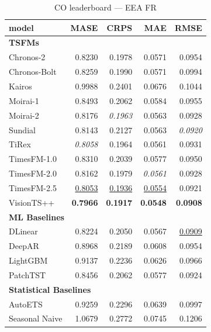 \begin{table}[H]
\caption{CO leaderboard --- EEA FR}
\centering
\begin{small}
\begin{tabular}{lrrrr}
\toprule
model & MASE & CRPS & MAE & RMSE \\
\midrule
\multicolumn{5}{l}{\textbf{TSFMs}} \\
Chronos-2 & 0.8230 & 0.1978 & 0.0571 & 0.0954 \\
Chronos-Bolt & 0.8259 & 0.1990 & 0.0571 & 0.0994 \\
Kairos & 0.9988 & 0.2401 & 0.0676 & 0.1044 \\
Moirai-1 & 0.8493 & 0.2062 & 0.0584 & 0.0955 \\
Moirai-2 & 0.8176 & \textit{0.1963} & 0.0563 & 0.0928 \\
Sundial & 0.8143 & 0.2127 & 0.0563 & \textit{0.0920} \\
TiRex & \textit{0.8058} & 0.1964 & 0.0561 & 0.0931 \\
TimesFM-1.0 & 0.8310 & 0.2039 & 0.0577 & 0.0950 \\
TimesFM-2.0 & 0.8162 & 0.1979 & \textit{0.0561} & 0.0928 \\
TimesFM-2.5 & \underline{0.8053} & \underline{0.1936} & \underline{0.0554} & 0.0921 \\
VisionTS++ & \textbf{0.7966} & \textbf{0.1917} & \textbf{0.0548} & \textbf{0.0908} \\
\midrule
\multicolumn{5}{l}{\textbf{ML Baselines}} \\
DLinear & 0.8224 & 0.2050 & 0.0567 & \underline{0.0909} \\
DeepAR & 0.8968 & 0.2189 & 0.0608 & 0.0954 \\
LightGBM & 0.9137 & 0.2236 & 0.0626 & 0.0966 \\
PatchTST & 0.8456 & 0.2062 & 0.0577 & 0.0924 \\
\midrule
\multicolumn{5}{l}{\textbf{Statistical Baselines}} \\
AutoETS & 0.9259 & 0.2296 & 0.0639 & 0.0997 \\
Seasonal Naive & 1.0679 & 0.2772 & 0.0745 & 0.1206 \\
\bottomrule
\end{tabular}
\end{small}
\end{table}